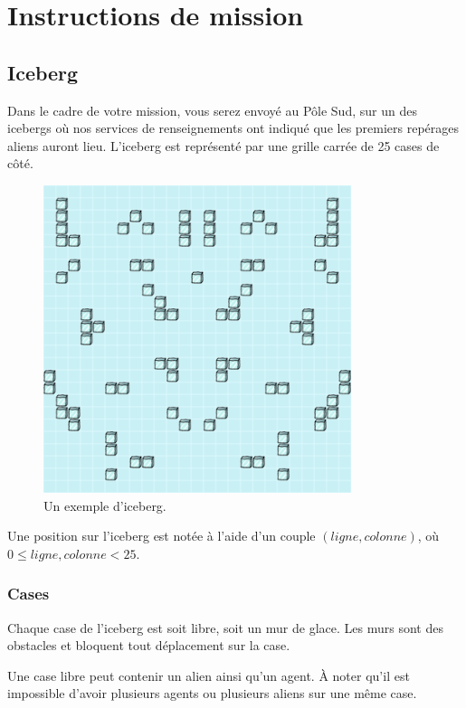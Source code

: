\section{Instructions de mission}\label{instructions-de-mission}

\subsection{Iceberg}\label{iceberg}

Dans le cadre de votre mission, vous serez envoyé au Pôle Sud, sur un
des icebergs où nos services de renseignements ont indiqué que les
premiers repérages aliens auront lieu. L'iceberg est représenté par une
grille carrée de 25 cases de côté.

\begin{figure}[!h]
    \centering
    \includegraphics[width=9cm]{img/map.png}
    \caption*{Un exemple d'iceberg.}
\end{figure}

Une position sur l'iceberg est notée à l'aide d'un couple $(ligne,
colonne)$, où $0 \leq ligne, colonne < 25$.

\subsubsection{Cases}\label{cases}

Chaque case de l'iceberg est soit libre, soit un mur de glace. Les murs
sont des obstacles et bloquent tout déplacement sur la case.

Une case libre peut contenir un alien ainsi qu'un agent. À noter qu'il
est impossible d'avoir plusieurs agents ou plusieurs aliens sur une même
case.

